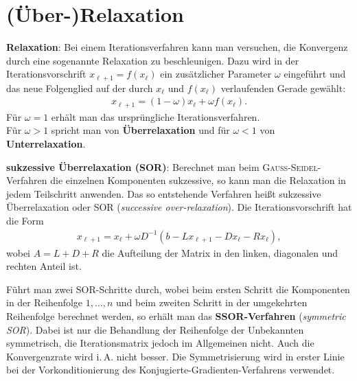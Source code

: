 \section{%
    (Über-)Relaxation%
}

\textbf{Relaxation}:
Bei einem Iterationsverfahren kann man versuchen, die Konvergenz durch
eine sogenannte Relaxation zu beschleunigen.
Dazu wird in der Iterationsvorschrift $x_{\ell+1} = f(x_\ell)$ ein zusätzlicher
Parameter $\omega$ eingeführt und das neue Folgenglied auf der durch
$x_\ell$ und $f(x_\ell)$ verlaufenden Gerade gewählt:
\begin{align*}
    x_{\ell+1} = (1 - \omega)x_\ell + \omega f(x_\ell).
\end{align*}
Für $\omega = 1$ erhält man das ursprüngliche Iterationsverfahren. \\
Für $\omega > 1$ spricht man von \textbf{Überrelaxation} und für $\omega < 1$
von \textbf{Unterrelaxation}.

\linie

\textbf{sukzessive Überrelaxation (SOR)}:
Berechnet man beim \textsc{Gauss}-\textsc{Seidel}-Verfahren die einzelnen
Komponenten sukzessive, so kann man die Relaxation in jedem Teilschritt
anwenden.
Das so entstehende Verfahren heißt sukzessive Überrelaxation oder SOR
(\emph{successive over-relaxation}).
Die Iterationsvorschrift hat die Form
\begin{align*}
    x_{\ell+1}
    = x_\ell + \omega D^{-1}(b - Lx_{\ell+1} - Dx_\ell - Rx_\ell),
\end{align*}
wobei $A = L + D + R$ die Aufteilung der Matrix in den linken, diagonalen
und rechten Anteil ist.

Führt man zwei SOR-Schritte durch, wobei beim ersten Schritt die Komponenten
in der Reihenfolge $1, \dotsc, n$ und beim zweiten Schritt in der umgekehrten
Reihenfolge berechnet werden, so erhält man das
\textbf{SSOR-Verfahren} (\emph{symmetric SOR}).
Dabei ist nur die Behandlung der Reihenfolge der Unbekannten symmetrisch,
die Iterationsmatrix jedoch im Allgemeinen nicht.
Auch die Konvergenzrate wird i.\,A. nicht besser.
Die Symmetrisierung wird in erster Linie bei der Vorkonditionierung des
Konjugierte-Gradienten-Verfahrens verwendet.
